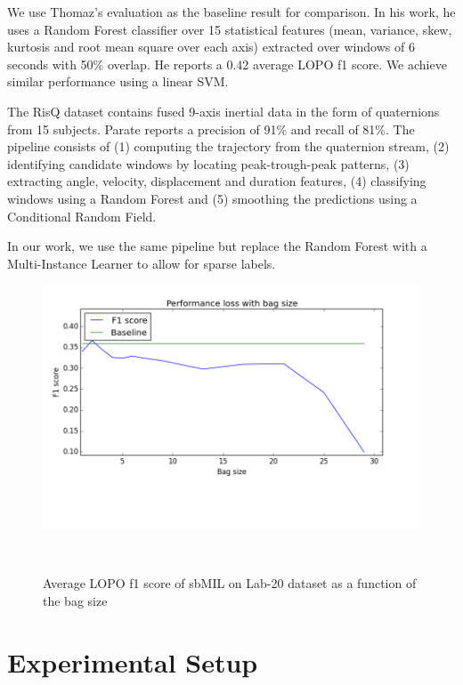 \documentclass{sigchi}
\begin{document}
We use Thomaz's evaluation as the baseline result for comparison. In his work, he uses a Random Forest classifier over 15 statistical features (mean, variance, skew, kurtosis and root mean square over each axis) extracted over windows of 6 seconds with 50\% overlap. He reports a 0.42 average LOPO f1 score. We achieve similar performance using a linear SVM.

The RisQ dataset contains fused 9-axis inertial data in the form of quaternions from 15 subjects. Parate reports a precision of 91\% and recall of 81\%. The pipeline consists of (1) computing the trajectory from the quaternion stream, (2) identifying candidate windows by locating peak-trough-peak patterns, (3) extracting angle, velocity, displacement and duration features, (4) classifying windows using a Random Forest and (5) smoothing the predictions using a Conditional Random Field.

In our work, we use the same pipeline but replace the Random Forest with a Multi-Instance Learner to allow for sparse labels.

\begin{figure}
\centering
  \includegraphics[width=0.9\columnwidth]{figures/sbMIL_bag_size2}
  \caption{Average LOPO f1 score of sbMIL on Lab-20 dataset as a function of the bag size}~\label{fig:figure1}
\end{figure}

\section{Experimental Setup}
\end{document}
